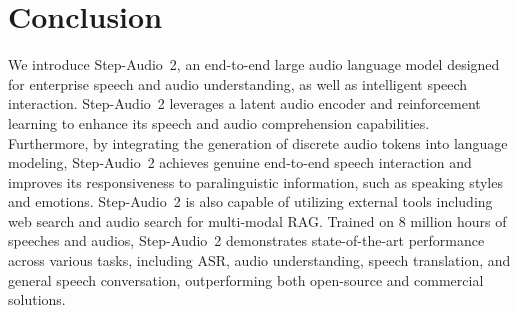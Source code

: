\section{Conclusion}
We introduce Step-Audio~2, an end-to-end large audio language model designed for enterprise speech and audio understanding, as well as intelligent speech interaction. Step-Audio~2 leverages a latent audio encoder and reinforcement learning to enhance its speech and audio comprehension capabilities. Furthermore, by integrating the generation of discrete audio tokens into language modeling, Step-Audio~2 achieves genuine end-to-end speech interaction and improves its responsiveness to paralinguistic information, such as speaking styles and emotions. Step-Audio~2 is also capable of utilizing external tools including web search and audio search for multi-modal RAG. Trained on 8 million hours of speeches and audios, Step-Audio~2 demonstrates state-of-the-art performance across various tasks, including ASR, audio understanding, speech translation, and general speech conversation, outperforming both open-source and commercial solutions.
